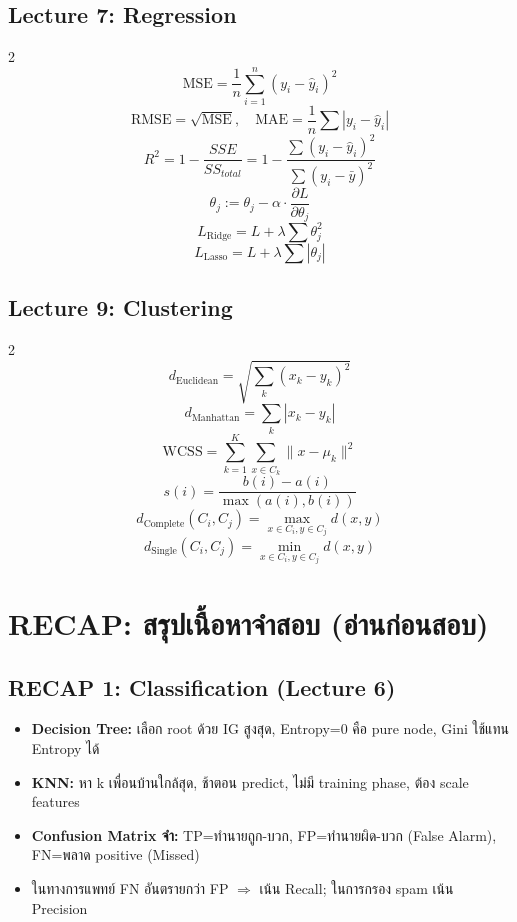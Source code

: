 \documentclass[a4paper,12pt]{article}
\begin{document}
\subsection*{Lecture 7: Regression}
\begin{multicols}{2}
\[
\text{MSE} = \frac{1}{n}\sum_{i=1}^{n}(y_i - \hat{y}_i)^2
\]
\[
\text{RMSE} = \sqrt{\text{MSE}}, \quad \text{MAE} = \frac{1}{n}\sum|y_i - \hat{y}_i|
\]
\[
R^2 = 1 - \frac{SSE}{SS_{total}} = 1 - \frac{\sum(y_i-\hat{y}_i)^2}{\sum(y_i-\bar{y})^2}
\]
\columnbreak
\[
\theta_j := \theta_j - \alpha \cdot \frac{\partial L}{\partial \theta_j}
\]
\[
L_{\text{Ridge}} = L + \lambda\sum\theta_j^2
\]
\[
L_{\text{Lasso}} = L + \lambda\sum|\theta_j|
\]
\end{multicols}

\subsection*{Lecture 9: Clustering}
\begin{multicols}{2}
\[
d_{\text{Euclidean}} = \sqrt{\sum_{k}(x_k - y_k)^2}
\]
\[
d_{\text{Manhattan}} = \sum_{k}|x_k - y_k|
\]
\[
\text{WCSS} = \sum_{k=1}^{K}\sum_{x \in C_k} \|x - \mu_k\|^2
\]
\columnbreak
\[
s(i) = \frac{b(i) - a(i)}{\max(a(i), b(i))}
\]
\[
d_{\text{Complete}}(C_i, C_j) = \max_{x \in C_i, y \in C_j} d(x,y)
\]
\[
d_{\text{Single}}(C_i, C_j) = \min_{x \in C_i, y \in C_j} d(x,y)
\]
\end{multicols}

\newpage

\section*{RECAP: สรุปเนื้อหาจำสอบ (อ่านก่อนสอบ)}

\subsection*{RECAP 1: Classification (Lecture 6)}
\begin{itemize}
    \item \textbf{Decision Tree:} เลือก root ด้วย IG สูงสุด, Entropy=0 คือ pure node, Gini ใช้แทน Entropy ได้
    \item \textbf{KNN:} หา k เพื่อนบ้านใกล้สุด, ช้าตอน predict, ไม่มี training phase, ต้อง scale features
    \item \textbf{Confusion Matrix จำ:} TP=ทำนายถูก-บวก, FP=ทำนายผิด-บวก (False Alarm), FN=พลาด positive (Missed)
    \item ในทางการแพทย์ FN อันตรายกว่า FP $\Rightarrow$ เน้น Recall; ในการกรอง spam เน้น Precision
\end{itemize}
\end{document}
